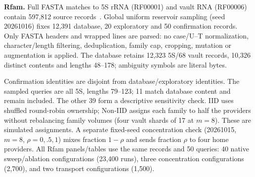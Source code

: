 \textbf{Rfam.} Full FASTA matches to 5S rRNA (RF00001) and vault RNA (RF00006) contain 597,812 source records~\cite{rfam2025}. Global uniform reservoir sampling (seed 20261016) fixes 12,391 database, 20 exploratory and 50 confirmation records. Only FASTA headers and wrapped lines are parsed: no case/U--T normalization, character/length filtering, deduplication, family cap, cropping, mutation or augmentation is applied. The database retains 12,323 5S/68 vault records, 10,326 distinct contents and lengths 48--178; ambiguity symbols are literal bytes.

Confirmation identities are disjoint from database/exploratory identities. The sampled queries are all 5S, lengths 79--123; 11 match database content and remain included. The other 39 form a descriptive sensitivity check. IID uses shuffled round-robin ownership; Non-IID assigns each family to half the providers without rebalancing family volumes (four vault shards of 17 at $m=8$). These are simulated assignments. A separate fixed-seed concentration check (20261015, $m=8$, $\rho=0,.5,1$) mixes fraction $1-\rho$ and sends fraction $\rho$ to four home providers. All Rfam panels/tables use the same records and 50 queries: 40 native sweep/ablation configurations (23,400 runs), three concentration configurations (2,700), and two transport configurations (1,500).
